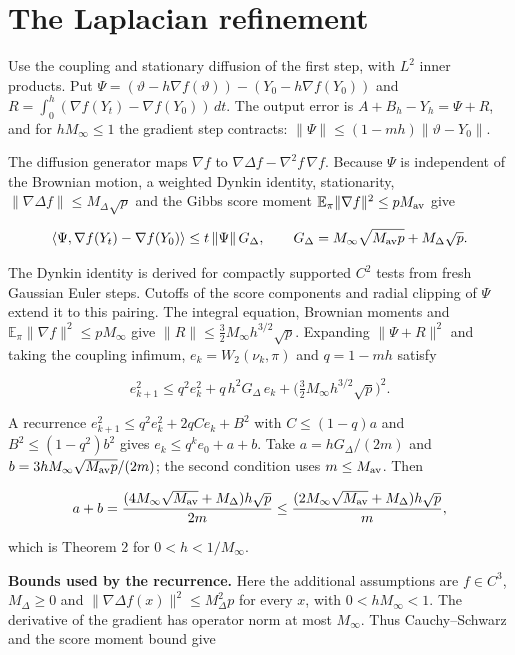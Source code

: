 \documentclass[11pt,a4paper]{article}
\begin{document}
\section{\texorpdfstring{The Laplacian refinement}{The Laplacian refinement}}


Use the coupling and
stationary diffusion of the first step, with \(L^2\) inner products. Put
\(\Psi=(\vartheta-h\nabla f(\vartheta))-(Y_0-h\nabla f(Y_0))\) and
\(R=\int_0^h(\nabla f(Y_t)-\nabla f(Y_0))\,dt\). The output error is
\(A+B_h-Y_h=\Psi+R\), and for \(hM_\infty\le1\) the gradient step contracts:
\(\|\Psi\|\le(1-mh)\|\vartheta-Y_0\|\).




The diffusion generator maps \(\nabla f\) to
\(\nabla\Delta f-\nabla^2f\,\nabla f\). Because \(\Psi\) is independent of the
Brownian motion, a weighted Dynkin identity, stationarity,
\(\|\nabla\Delta f\|\le M_\Delta\sqrt p\) and the Gibbs score moment
\(\mathbb E_\pi\|\nabla f\|^2\le pM_{\rm av}\) give


\[\langle\Psi,\nabla f(Y_t)-\nabla f(Y_0)\rangle\le t\,\|\Psi\|\,G_\Delta,
\qquad G_\Delta=M_\infty\sqrt{M_{\rm av}p}+M_\Delta\sqrt p.\]


The Dynkin identity is derived for compactly supported \(C^2\) tests from
fresh Gaussian Euler steps. Cutoffs of the score components and radial
clipping of \(\Psi\) extend it to this pairing. The integral equation,
Brownian moments and \(\mathbb E_\pi\|\nabla f\|^2\le pM_\infty\) give
\(\|R\|\le\tfrac32M_\infty h^{3/2}\sqrt p\). Expanding \(\|\Psi+R\|^2\) and
taking the coupling infimum, \(e_k=W_2(\nu_k,\pi)\) and \(q=1-mh\) satisfy


\[e_{k+1}^2\le q^2e_k^2+q\,h^2G_\Delta\,e_k+\bigl(\tfrac32M_\infty h^{3/2}\sqrt p\bigr)^2.\]


A recurrence \(e_{k+1}^2\le q^2e_k^2+2qCe_k+B^2\) with
\(C\le(1-q)a\) and \(B^2\le(1-q^2)b^2\) gives \(e_k\le q^ke_0+a+b\). Take
\(a=hG_\Delta/(2m)\) and \(b=3hM_\infty\sqrt{M_{\rm av}p}/(2m)\); the second
condition uses \(m\le M_{\rm av}\). Then


\[a+b=\frac{(4M_\infty\sqrt{M_{\rm av}}+M_\Delta)h\sqrt p}{2m}
\le\frac{(2M_\infty\sqrt{M_{\rm av}}+M_\Delta)h\sqrt p}{m},\]


which is Theorem 2 for \(0<h<1/M_\infty\).




\textbf{Bounds used by the recurrence.} Here the additional assumptions are \(f\in C^3\), \(M_\Delta\ge0\) and \(\|\nabla\Delta f(x)\|^2\le M_\Delta^2p\) for every \(x\), with \(0<hM_\infty<1\). The derivative of the gradient has operator norm at most \(M_\infty\). Thus Cauchy–Schwarz and the score moment bound give
\end{document}

